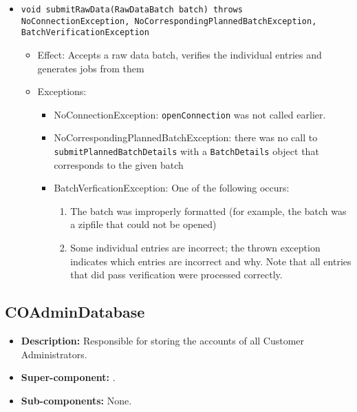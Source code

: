 \begin{itemize}
\begin{itemize}
		\item \texttt{void submitRawData(RawDataBatch batch) throws NoConnectionException, NoCorrespondingPlannedBatchException, BatchVerificationException}
		\begin{itemize}
			\item Effect: Accepts a raw data batch, verifies the individual entries and generates jobs from them
			\item Exceptions:
			\begin{itemize}
				\item NoConnectionException: \texttt{openConnection} was not called earlier.
				\item NoCorrespondingPlannedBatchException: there was no call to \texttt{submitPlannedBatchDetails} with a \texttt{BatchDetails} object that corresponds to the given batch
				\item BatchVerficationException: One of the following occurs:
				\begin{enumerate}
					\item The batch was improperly formatted (for example, the batch was a zipfile that could not be opened)
					\item Some individual entries are incorrect; the thrown exception indicates which entries are incorrect and why. Note that all entries that did pass verification were processed correctly.
				\end{enumerate} 
			\end{itemize}
		\end{itemize}
	\end{itemize}
\end{itemize}

\subsection{COAdminDatabase}
\begin{itemize}
    \item \textbf{Description:} Responsible for storing the accounts of all Customer Administrators.
    \item \textbf{Super-component:} .
    \item \textbf{Sub-components:} None.
\end{itemize}

